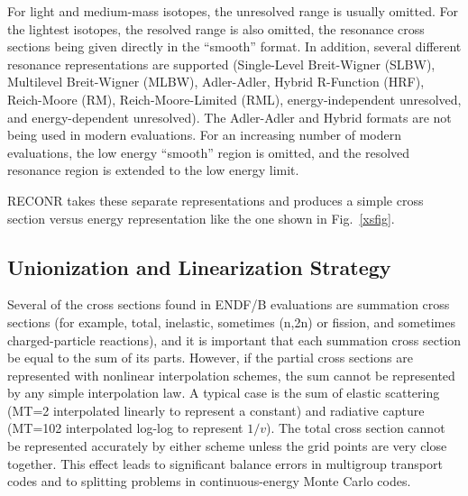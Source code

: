 For light and medium-mass isotopes, the unresolved range is
usually omitted.  For the lightest isotopes, the resolved range
is also omitted, the resonance cross sections being given
directly in the ``smooth'' format.  In addition, several
different resonance representations are supported
(Single-Level Breit-Wigner (SLBW), Multilevel Breit-Wigner (MLBW), Adler-Adler,
Hybrid R-Function (HRF), Reich-Moore (RM), Reich-Moore-Limited (RML),
energy-independent unresolved, and energy-dependent
unresolved).  The Adler-Adler and Hybrid formats are not
being used in modern evaluations.  For an increasing number
of modern evaluations, the low energy ``smooth'' region is
omitted, and the resolved resonance region is extended to the
low energy limit.

RECONR takes these separate representations and produces a simple
cross section versus energy representation like the one shown
in Fig.~\ref{xsfig}.

\subsection{Unionization and Linearization Strategy}
\label{ssRECONR_union}

Several of the cross sections found in ENDF/B evaluations are
summation cross sections
(for example, total, inelastic, sometimes (n,2n) or fission,
and sometimes charged-particle reactions), and it is important
that each summation cross section be equal to the sum of its parts.
However, if the partial cross sections are represented with
nonlinear interpolation
 schemes, the sum cannot be represented
by any simple interpolation law.  A typical case is the sum
of elastic scattering (MT=2 interpolated linearly to represent
a constant) and radiative capture (MT=102 interpolated log-log
to represent $1/v$).  The total cross section cannot be
represented accurately by either scheme unless the grid points
are very close together.  This effect leads to significant
balance errors in multigroup transport codes and to splitting
problems in continuous-energy Monte Carlo codes.

